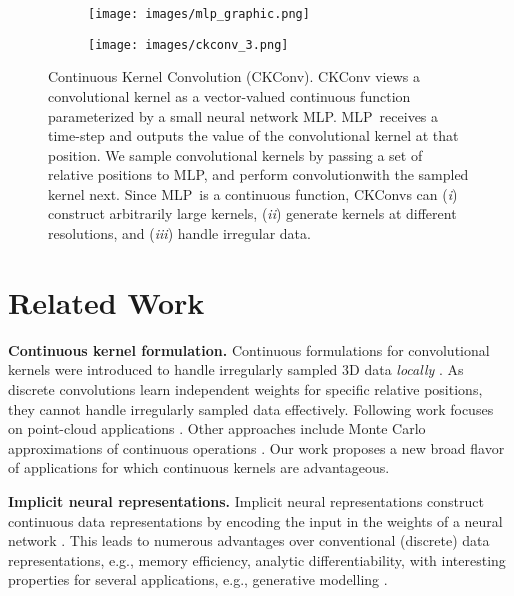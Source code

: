 \documentclass{article}
\newcommand{\mlp}{{\btt MLP}}
\newcommand{\mlppsi}{\mlp}
\begin{document}
\begin{figure}
    \centering
    \hfill
         \begin{subfigure}[b]{0.115\textwidth}
         \centering
         \texttt{[image: images/mlp\_graphic.png]}
\end{subfigure}
     \hfill
     \begin{subfigure}[b]{0.75\textwidth}
         \centering
         \texttt{[image: images/ckconv\_3.png]}
\end{subfigure}
     \hfill
    \vspace{-2mm}
    \caption{Continuous Kernel Convolution (CKConv). CKConv views a convolutional kernel as a vector-valued continuous function  parameterized by a small neural network \mlppsi. \mlppsi\ receives a time-step and outputs the value of the convolutional kernel at that position. We sample convolutional kernels by passing a set of relative positions  to \mlppsi, and perform convolution\break with the sampled kernel next. Since \mlppsi\ is a continuous function, CKConvs can (\textit{i}) construct arbitrarily large kernels, (\textit{ii}) generate kernels at different resolutions, and (\textit{iii}) handle irregular data.\vspace{-2.5mm}}
    \label{fig:ckconv}
\end{figure}
\vspace{-2mm}
\section{Related Work}\label{sec:related_work}
\vspace{-2mm}
\textbf{Continuous kernel formulation.} Continuous formulations for convolutional kernels were introduced to handle irregularly sampled 3D data \textit{locally} \citep{schutt2017schnet, simonovsky2017dynamic, wang2018deep, wu2019pointconv}. As discrete convolutions learn independent weights for specific relative positions, they cannot handle irregularly sampled data effectively. Following work focuses on point-cloud applications \citep{fuchs2020se, hu2020randla, shi2019points, thomas2018tensor}. Other approaches include Monte Carlo approximations of continuous operations \citep{finzi2020generalizing}.
Our work proposes a new broad flavor of applications for which continuous kernels are advantageous.

\textbf{Implicit neural representations.} Implicit neural representations construct continuous data representations by encoding the input in the weights of a neural network \citep{mescheder2019occupancy, park2019deepsdf, sitzmann2020implicit}. This leads to numerous advantages over conventional (discrete) data representations, e.g., memory efficiency, analytic differentiability, with interesting properties for several applications, e.g., generative modelling \citep{dupont2021generative, schwarz2020graf}.
\end{document}
